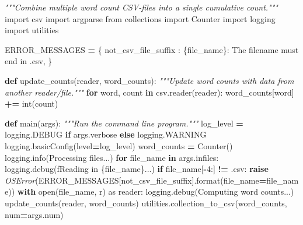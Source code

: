 \documentclass[
]{krantz}
\makeatletter
\newenvironment{Shaded}{\begin{snugshade}}{\end{snugshade}}
\newcommand{\BuiltInTok}[1]{#1}
\newcommand{\CommentTok}[1]{\textcolor[rgb]{0.56,0.35,0.01}{\textit{#1}}}
\newcommand{\ControlFlowTok}[1]{\textcolor[rgb]{0.13,0.29,0.53}{\textbf{#1}}}
\newcommand{\DecValTok}[1]{\textcolor[rgb]{0.00,0.00,0.81}{#1}}
\newcommand{\ImportTok}[1]{#1}
\newcommand{\KeywordTok}[1]{\textcolor[rgb]{0.13,0.29,0.53}{\textbf{#1}}}
\newcommand{\NormalTok}[1]{#1}
\newcommand{\OperatorTok}[1]{\textcolor[rgb]{0.81,0.36,0.00}{\textbf{#1}}}
\newcommand{\PreprocessorTok}[1]{\textcolor[rgb]{0.56,0.35,0.01}{\textit{#1}}}
\newcommand{\SpecialCharTok}[1]{\textcolor[rgb]{0.00,0.00,0.00}{#1}}
\newcommand{\SpecialStringTok}[1]{\textcolor[rgb]{0.31,0.60,0.02}{#1}}
\newcommand{\StringTok}[1]{\textcolor[rgb]{0.31,0.60,0.02}{#1}}
\newenvironment{kframe}{%
\medskip{}
\setlength{\fboxsep}{.8em}
 \def\at@end@of@kframe{}%
 \ifinner\ifhmode%
  \def\at@end@of@kframe{\end{minipage}}%
  \begin{minipage}{\columnwidth}%
 \fi\fi%
 \def\FrameCommand##1{\hskip\@totalleftmargin \hskip-\fboxsep
 \colorbox{shadecolor}{##1}\hskip-\fboxsep
     \hskip-\linewidth \hskip-\@totalleftmargin \hskip\columnwidth}%
 \MakeFramed {\advance\hsize-\width
   \@totalleftmargin\z@ \linewidth\hsize
   \@setminipage}}%
 {\par\unskip\endMakeFramed%
 \at@end@of@kframe}
\renewenvironment{Shaded}{\begin{kframe}}{\end{kframe}}
\makeatother
\begin{document}
\begin{Shaded}
\begin{Highlighting}[]
\CommentTok{"""Combine multiple word count CSV{-}files into a single cumulative count."""}
\ImportTok{import}\NormalTok{ csv}
\ImportTok{import}\NormalTok{ argparse}
\ImportTok{from}\NormalTok{ collections }\ImportTok{import}\NormalTok{ Counter}
\ImportTok{import}\NormalTok{ logging}
\ImportTok{import}\NormalTok{ utilities}


\NormalTok{ERROR\_MESSAGES }\OperatorTok{=}\NormalTok{ \{}
    \StringTok{\textquotesingle{}not\_csv\_file\_suffix\textquotesingle{}}\NormalTok{ : }\StringTok{\textquotesingle{}}\SpecialCharTok{\{file\_name\}}\StringTok{: The filename must end in \textasciigrave{}.csv\textasciigrave{}\textquotesingle{}}\NormalTok{,}
\NormalTok{\}}

\KeywordTok{def}\NormalTok{ update\_counts(reader, word\_counts):}
    \CommentTok{"""Update word counts with data from another reader/file."""}
    \ControlFlowTok{for}\NormalTok{ word, count }\KeywordTok{in}\NormalTok{ csv.reader(reader):}
\NormalTok{        word\_counts[word] }\OperatorTok{+=} \BuiltInTok{int}\NormalTok{(count)}

\KeywordTok{def}\NormalTok{ main(args):}
    \CommentTok{"""Run the command line program."""}
\NormalTok{    log\_level }\OperatorTok{=}\NormalTok{ logging.DEBUG }\ControlFlowTok{if}\NormalTok{ args.verbose }\ControlFlowTok{else}\NormalTok{ logging.WARNING}
\NormalTok{    logging.basicConfig(level}\OperatorTok{=}\NormalTok{log\_level)}
\NormalTok{    word\_counts }\OperatorTok{=}\NormalTok{ Counter()}
\NormalTok{    logging.info(}\StringTok{\textquotesingle{}Processing files...\textquotesingle{}}\NormalTok{)}
    \ControlFlowTok{for}\NormalTok{ file\_name }\KeywordTok{in}\NormalTok{ args.infiles:}
\NormalTok{        logging.debug(}\SpecialStringTok{f\textquotesingle{}Reading in }\SpecialCharTok{\{}\NormalTok{file\_name}\SpecialCharTok{\}}\SpecialStringTok{...\textquotesingle{}}\NormalTok{)}
        \ControlFlowTok{if}\NormalTok{ file\_name[}\OperatorTok{{-}}\DecValTok{4}\NormalTok{:] }\OperatorTok{!=} \StringTok{\textquotesingle{}.csv\textquotesingle{}}\NormalTok{:}
            \ControlFlowTok{raise} \PreprocessorTok{OSError}\NormalTok{(ERROR\_MESSAGES[}\StringTok{\textquotesingle{}not\_csv\_file\_suffix\textquotesingle{}}\NormalTok{].}\BuiltInTok{format}\NormalTok{(file\_name}\OperatorTok{=}\NormalTok{file\_name))}
        \ControlFlowTok{with} \BuiltInTok{open}\NormalTok{(file\_name, }\StringTok{\textquotesingle{}r\textquotesingle{}}\NormalTok{) }\ImportTok{as}\NormalTok{ reader:}
\NormalTok{            logging.debug(}\StringTok{\textquotesingle{}Computing word counts...\textquotesingle{}}\NormalTok{)}
\NormalTok{            update\_counts(reader, word\_counts)}
\NormalTok{    utilities.collection\_to\_csv(word\_counts, num}\OperatorTok{=}\NormalTok{args.num)}


\end{Highlighting}
\end{Shaded}
\end{document}
